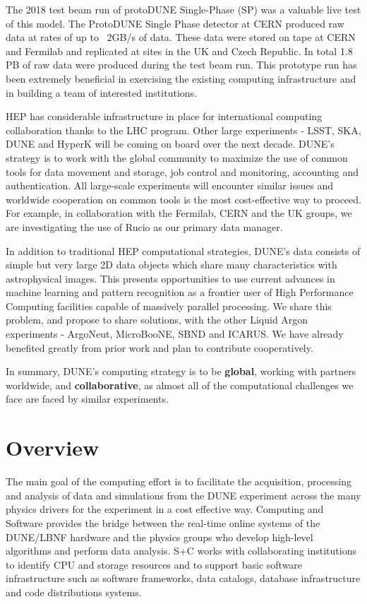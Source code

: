 The 2018 test beam run of protoDUNE Single-Phase (SP) was a valuable live test of this model.  The ProtoDUNE Single Phase detector at CERN produced raw data at rates of up to ~2GB/s of data.  These data were stored on tape at CERN and Fermilab and replicated at sites in the UK and Czech Republic.  In total 1.8 PB of raw data were produced during the test beam run. 
This prototype run has been extremely beneficial in exercising the existing computing infrastructure and in building a team of interested institutions.

HEP has considerable infrastructure in place for international computing collaboration thanks to the LHC program.  Other large experiments - LSST, SKA, DUNE and HyperK will be coming on board over the next decade.   DUNE's strategy is to work with the global community to maximize the use of common tools for data movement and storage, job control and monitoring, accounting and authentication.   All large-scale experiments will encounter similar issues and worldwide cooperation on common tools is the most cost-effective way to proceed. For example, in collaboration with the Fermilab, CERN and the UK groups, we are investigating the use of Rucio as our primary data manager.

In addition to traditional HEP computational strategies, DUNE's data consists of simple but very large 2D data objects which share many characteristics with astrophysical images.  This presents opportunities to use current advances in machine learning and pattern recognition as a frontier user of High Performance Computing facilities capable of massively parallel processing.  We share this problem, and propose to share solutions, with the other Liquid Argon experiments - ArgoNeut, MicroBooNE, SBND and ICARUS.  We have already benefited greatly from prior work and plan to contribute cooperatively.

In summary, DUNE's computing strategy is to be {\bf global}, working with partners worldwide, and {\bf collaborative}, as almost all of the computational challenges we face are faced by similar experiments. 
 


\section{Overview}		
\label{ch:exec-comp-ovr}
The main goal of the computing effort is to facilitate the acquisition, processing and analysis of data and simulations from the DUNE experiment across the many physics drivers for the experiment in a cost effective way. Computing and Software provides the bridge between the real-time online systems of the DUNE/LBNF hardware and the physics groups who develop high-level algorithms and perform data analysis. S+C works with collaborating institutions to identify CPU and storage resources and to support basic software infrastructure such as software frameworks, data catalogs, database infrastructure and code distributions systems. 

